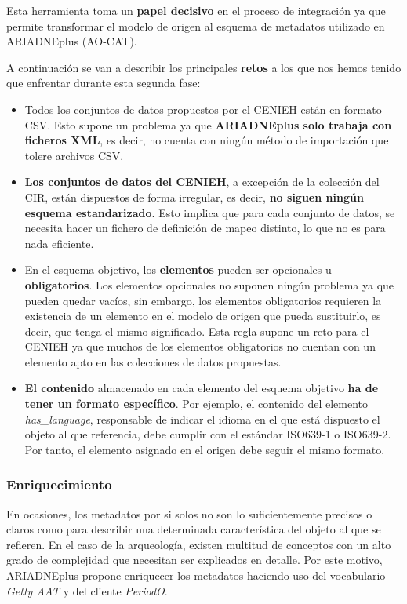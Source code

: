 \documentclass[
]{article}
\providecommand{\tightlist}{%
  \setlength{\itemsep}{0pt}\setlength{\parskip}{0pt}}
\begin{document}
Esta herramienta toma un \textbf{papel decisivo} en el proceso de
integración ya que permite transformar el modelo de origen al esquema de
metadatos utilizado en ARIADNEplus (AO-CAT).

A continuación se van a describir los principales \textbf{retos} a los
que nos hemos tenido que enfrentar durante esta segunda fase:

\begin{itemize}
\tightlist
\item
  Todos los conjuntos de datos propuestos por el CENIEH están en formato
  CSV. Esto supone un problema ya que \textbf{ARIADNEplus solo trabaja
  con ficheros XML}, es decir, no cuenta con ningún método de
  importación que tolere archivos CSV.
\item
  \textbf{Los conjuntos de datos del CENIEH}, a excepción de la
  colección del CIR, están dispuestos de forma irregular, es decir,
  \textbf{no siguen ningún esquema estandarizado}. Esto implica que para
  cada conjunto de datos, se necesita hacer un fichero de definición de
  mapeo distinto, lo que no es para nada eficiente.
\item
  En el esquema objetivo, los \textbf{elementos} pueden ser opcionales u
  \textbf{obligatorios}. Los elementos opcionales no suponen ningún
  problema ya que pueden quedar vacíos, sin embargo, los elementos
  obligatorios requieren la existencia de un elemento en el modelo de
  origen que pueda sustituirlo, es decir, que tenga el mismo
  significado. Esta regla supone un reto para el CENIEH ya que muchos de
  los elementos obligatorios no cuentan con un elemento apto en las
  colecciones de datos propuestas.
\item
  \textbf{El contenido} almacenado en cada elemento del esquema objetivo
  \textbf{ha de tener un formato específico}. Por ejemplo, el contenido
  del elemento \emph{has\_language}, responsable de indicar el idioma en
  el que está dispuesto el objeto al que referencia, debe cumplir con el
  estándar ISO639-1 o ISO639-2. Por tanto, el elemento asignado en el
  origen debe seguir el mismo formato.
\end{itemize}

\hypertarget{enriquecimiento}{%
\subsubsection{Enriquecimiento}\label{enriquecimiento}}

En ocasiones, los metadatos por si solos no son lo suficientemente
precisos o claros como para describir una determinada característica del
objeto al que se refieren. En el caso de la arqueología, existen
multitud de conceptos con un alto grado de complejidad que necesitan ser
explicados en detalle. Por este motivo, ARIADNEplus propone enriquecer
los metadatos haciendo uso del vocabulario \emph{Getty AAT} y del
cliente \emph{PeriodO}.
\end{document}
